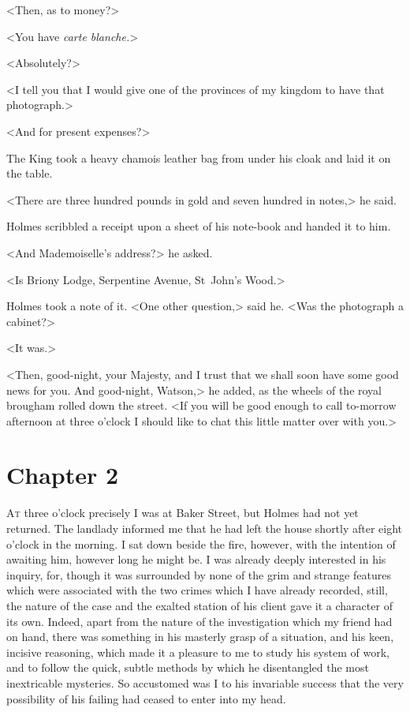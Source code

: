 <Then, as to money?>

<You have \textit{carte blanche.}>

<Absolutely?>

<I tell you that I would give one of the provinces of my kingdom to have that photograph.>

<And for present expenses?>

The King took a heavy chamois leather bag from under his cloak and laid it on the table.

<There are three hundred pounds in gold and seven hundred in notes,> he said.

Holmes scribbled a receipt upon a sheet of his note-book and handed it to him.

<And Mademoiselle's address?> he asked.

<Is Briony Lodge, Serpentine Avenue, St~John's Wood.>

Holmes took a note of it. <One other question,> said he. <Was the photograph a cabinet?>

<It was.>

<Then, good-night, your Majesty, and I trust that we shall soon have some good news for you. And good-night, Watson,> he added, as the wheels of the royal brougham rolled down the street. <If you will be good enough to call to-morrow afternoon at three o'clock I should like to chat this little matter over with you.>

\cleardoubleoddpage

\vspace*{10pt}
\section{Chapter 2}
\thispagestyle{plain}
	
	\lettrine[lines=4]{A}{t} three o'clock precisely I was at Baker Street, but Holmes had not yet returned. The landlady informed me that he had left the house shortly after eight o'clock in the morning. I sat down beside the fire, however, with the intention of awaiting him, however long he might be. I was already deeply interested in his inquiry, for, though it was surrounded by none of the grim and strange features which were associated with the two crimes which I have already recorded, still, the nature of the case and the exalted station of his client gave it a character of its own. Indeed, apart from the nature of the investigation which my friend had on hand, there was something in his masterly grasp of a situation, and his keen, incisive reasoning, which made it a pleasure to me to study his system of work, and to follow the quick, subtle methods by which he disentangled the most inextricable mysteries. So accustomed was I to his invariable success that the very possibility of his failing had ceased to enter into my head.

